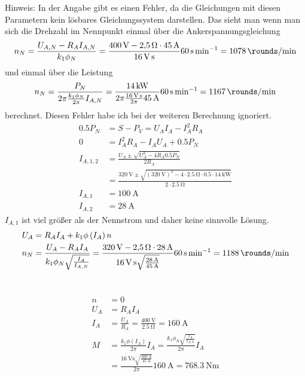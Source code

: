 \documentclass[11pt,a4paper]{scrartcl}
\newcommand{\mybr}[1]{\left(#1\right)}
\newcommand{\0}{_{\mybr{0}}}
\newcommand{\1}{_{\mybr{1}}}
\newcommand{\2}{_{\mybr{2}}}
\begin{document}
\section{}
Hinweis: In der Angabe gibt es einen Fehler, da die Gleichungen mit diesen Parametern kein lösbares Gleichungssystem darstellen. Das sieht man wenn man sich die Drehzahl im Nennpunkt einmal über die Ankerspannungsgleichung
\begin{equation}
n_N=\frac{U_{A,N}-R_A I_{A,N}}{k_1\phi_N}=\frac{\SI{400}{\volt}-\SI{2.5}{\ohm}\cdot\SI{45}{\ampere}}{\SI{16}{\volt\second}}\SI{60}{\second\per\minute}=\SI{1078}{\rounds\per\minute}
\end{equation}
und einmal über die Leistung
\begin{equation}
n_N=\frac{P_N}{2\pi\frac{k_1\phi_N}{2\pi}I_{A,N}}=\frac{\SI{14}{\kilo\watt}}{2\pi\frac{\SI{16}{\volt\second}}{2\pi}\SI{45}{\ampere}}\SI{60}{\second\per\minute}=\SI{1167}{\rounds\per\minute}
\end{equation}
berechnet. Diesen Fehler habe ich bei der weiteren Berechnung ignoriert.
\begin{align}
\num{0.5}P_N&=S-P_V=U_A I_A - I_A^2 R_A\\
0&=I_A^2 R_A - I_A U_A + \num{0.5}P_N\\
I_{A,1,2}&=\frac{U_A\pm\sqrt{U_A^2-4 R_A \num{0.5}P_N}}{2 R_A}\\
&=\frac{\SI{320}{\volt}\pm\sqrt{\mybr{\SI{320}{\volt}}^2-4 \cdot \SI{2.5}{\ohm}\cdot \num{0.5}\cdot\SI{14}{\kilo\watt}}}{2 \cdot \SI{2.5}{\ohm}}\\
I_{A,1}&=\SI{100}{\ampere}\\
I_{A,2}&=\SI{28}{\ampere}
\end{align}
$I_{A,1}$ ist viel größer als der Nennstrom und daher keine sinnvolle Lösung.
\begin{align}
U_A&=R_A I_A + k_1\phi\mybr{I_A} n\\
n_N&=\frac{U_A-R_A I_A}{k_1\phi_N\sqrt{\frac{I_A}{I_{A,N}}}}=\frac{\SI{320}{\volt}-\SI{2.5}{\ohm}\cdot\SI{28}{\ampere}}{\SI{16}{\volt\second}\sqrt{\frac{\SI{28}{\ampere}}{\SI{45}{\ampere}}}}\SI{60}{\second\per\minute}=\SI{1188}{\rounds\per\minute}
\end{align}

\section{}
\subsection{}
\begin{align}
n&=0\\
U_A&=R_A I_A\\
I_A&=\frac{U_A}{R_A}=\frac{\SI{400}{\volt}}{\SI{2.5}{\ohm}}=\SI{160}{\ampere}\\
M&=\frac{k_1\phi\mybr{I_A}}{2\pi}I_A=\frac{k_1\phi_N\sqrt{\frac{I_A}{I_{A,N}}}}{2\pi}I_A\\
&=\frac{\SI{16}{\volt\second}\sqrt{\frac{\SI{160}{\ampere}}{\SI{45}{\ampere}}}}{2\pi}\SI{160}{\ampere}=\SI{768.3}{\newton\metre}
\end{align}
\end{document}
